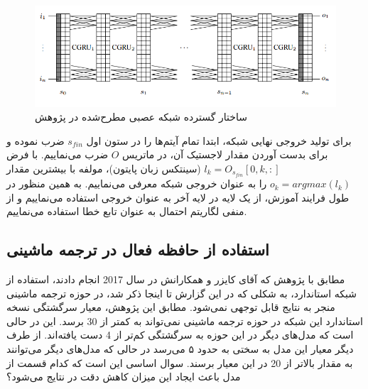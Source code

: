 \begin{figure}[h]
\centering
\includegraphics[scale=0.5]{Imgs/NeuralGPU.png}
\caption{ساختار گسترده شبکه عصبی  مطرح‌شده در پژوهش \cite{lukas2016neural}}
\label{fig:6-gpu1}
\end{figure}

برای تولید خروجی نهایی شبکه، ابتدا تمام آیتم‌ها را در ستون اول $s_{fin}$ ضرب نموده و برای بدست آوردن مقدار لاجستیک آن، در ماتریس $O$ ضرب می‌نماییم. با فرض $l_k = O_{s_{fin}}[0,k,:]$ (سینتکس زبان پایتون)، مولفه با بیشترین مقدار $o_k = argmax(l_k)$  را به عنوان خروجی شبکه معرفی می‌نماییم. به همین منظور در طول فرایند آموزش، از یک لایه  در لایه آخر به عنوان خروجی استفاده می‌نماییم و از منفی لگاریتم احتمال به عنوان تابع خطا استفاده می‌نماییم. 

\subsection{استفاده از حافظه فعال در ترجمه ماشینی}
مطابق با پژوهش \cite{lukas2017can} که آقای کایزر و همکارانش در سال 2017 انجام دادند، استفاده از شبکه  استاندارد، به شکلی که در این گزارش تا اینجا ذکر شد، در حوزه ترجمه ماشینی منجر به نتایج قابل توجهی نمی‌شود. مطابق این پژوهش، معیار سرگشتگی نسخه استاندارد این شبکه در حوزه ترجمه ماشینی نمی‌تواند به کمتر از 30 برسد. این در حالی است که مدل‌های دیگر در این حوزه به سرگشتگی کم‌تر از 4 دست یافته‌اند. از طرف دیگر معیار  این مدل به سختی به حدود ۵ می‌رسد در حالی‌ که مدل‌های دیگر می‌توانند به مقدار بالاتر از 20 در این معیار برسند. سوال اساسی این است که کدام قسمت از مدل باعث ایجاد این میزان کاهش دقت در نتایج می‌شود؟

